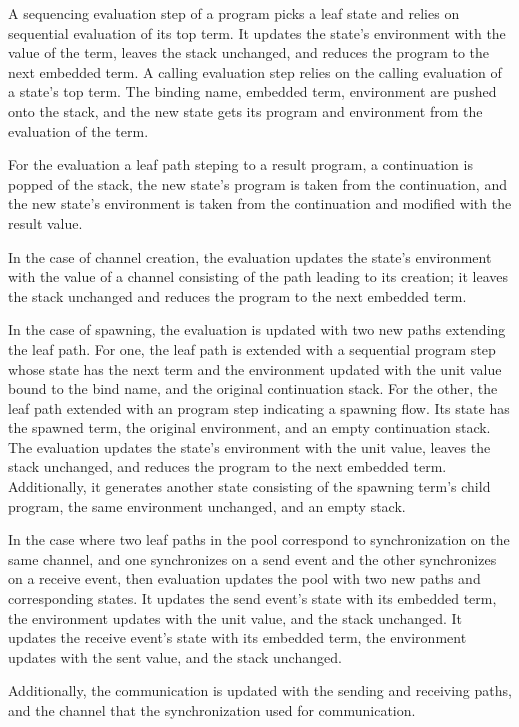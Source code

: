 \documentclass[letterpaper, 11pt]{extarticle}
\begin{document}
A sequencing evaluation step of a program picks a leaf state and relies on
sequential evaluation of its top term. It updates the state's environment with the
value of the term, leaves the stack unchanged, and reduces the program to the next
embedded term. A calling evaluation step relies on the calling evaluation of a state's top
term. The binding name, embedded term, environment are pushed onto the stack, and the new
state gets its program and environment from the evaluation of the term. 

For the evaluation a leaf path steping to a result program, a continuation is popped of the
stack, the new state's program is taken from the continuation, and the new state's environment
is taken from the continuation and modified with the result value.

In the case of channel creation, the evaluation updates the state's environment with the
value of a channel consisting of the path leading to its creation; it leaves the stack
unchanged and reduces the program to the next embedded term.

In the case of spawning, the evaluation is updated with two
new paths extending the leaf path.  For one, the leaf path is extended with a sequential
program step whose state has the next term and the environment updated
with the unit value bound to
the bind name, and the original continuation stack. For the other, the leaf path
extended with an program step indicating a spawning flow.  Its state has the spawned
term, the original environment, and an empty continuation stack. 
The evaluation updates the state's environment with the
unit value, leaves the stack unchanged, and reduces the program to the next embedded term.
Additionally, it generates another state consisting of the spawning term's child
program, the same environment unchanged, and an empty stack.

In the case where two leaf paths in the pool correspond to synchronization on the same channel,
and one synchronizes on a send event and the other synchronizes on a receive event, then
evaluation updates the pool with two new paths and corresponding states.
It updates the send event's state with its embedded term, the environment updates with the unit
value, and the stack unchanged.  It updates the receive event's state with its embedded term, the
environment updates with the sent value, and the stack unchanged.

Additionally, the communication is updated with the sending and receiving paths, and the channel
that the synchronization used for communication. 
\end{document}

